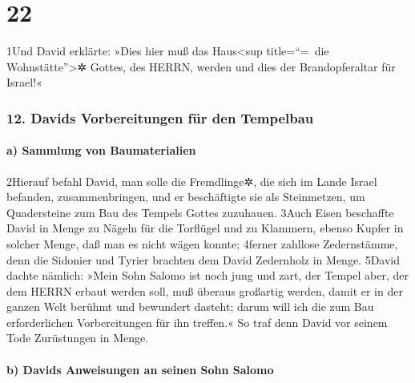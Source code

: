 \hypertarget{section-21}{%
\section{22}\label{section-21}}

1Und David erklärte: »Dies hier muß das Haus\textless sup title=``=~die
Wohnstätte''\textgreater✲ Gottes, des HERRN, werden und dies der
Brandopferaltar für Israel!«

\hypertarget{davids-vorbereitungen-fuxfcr-den-tempelbau}{%
\subsubsection{12. Davids Vorbereitungen für den
Tempelbau}\label{davids-vorbereitungen-fuxfcr-den-tempelbau}}

\hypertarget{a-sammlung-von-baumaterialien}{%
\paragraph{a) Sammlung von
Baumaterialien}\label{a-sammlung-von-baumaterialien}}

2Hierauf befahl David, man solle die Fremdlinge✲, die sich im Lande
Israel befanden, zusammenbringen, und er beschäftigte sie als
Steinmetzen, um Quadersteine zum Bau des Tempels Gottes zuzuhauen. 3Auch
Eisen beschaffte David in Menge zu Nägeln für die Torflügel und zu
Klammern, ebenso Kupfer in solcher Menge, daß man es nicht wägen konnte;
4ferner zahllose Zedernstämme, denn die Sidonier und Tyrier brachten dem
David Zedernholz in Menge. 5David dachte nämlich: »Mein Sohn Salomo ist
noch jung und zart, der Tempel aber, der dem HERRN erbaut werden soll,
muß überaus großartig werden, damit er in der ganzen Welt berühmt und
bewundert dasteht; darum will ich die zum Bau erforderlichen
Vorbereitungen für ihn treffen.« So traf denn David vor seinem Tode
Zurüstungen in Menge.

\hypertarget{b-davids-anweisungen-an-seinen-sohn-salomo}{%
\paragraph{b) Davids Anweisungen an seinen Sohn
Salomo}\label{b-davids-anweisungen-an-seinen-sohn-salomo}}

